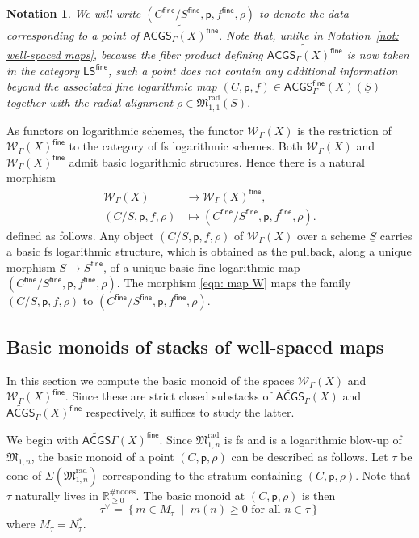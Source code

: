 \documentclass{article}
\def\R{\mathbb{R}}
\def\WG{\mathcal{W}_{\Gamma}}
\newtheorem{notation}[definition]{Notation}
\newcommand{\rad}{\mathrm{rad}}
\newcommand{\fine}{\mathsf{fine}}
\begin{document}
\begin{notation}
   We will write $(C^{\fine}/S^{\fine},\mathsf{p},f^{\fine},\rho)$ to denote the data corresponding to a point of
$
\widetilde{\mathsf{ACGS}_{\Gamma}(X)^{\mathsf{fine}}}.
$
Note that, unlike in Notation~\ref{not: well-spaced maps}, because the fiber product defining 
$
\widetilde{\mathsf{ACGS}_{\Gamma}(X)^{\mathsf{fine}}}
$
is now taken in the category $\mathsf{LS}^{\fine}$, such a point does not contain any additional information beyond the associated fine logarithmic map
$
(C,\mathsf{p},f)\in \mathsf{ACGS}^{\fine}_{\Gamma}(X)(\underline{S})
$
together with the radial alignment
$
\rho\in \mathfrak{M}_{1,1}^{\mathrm{rad}}(\underline{S}).
$
\end{notation}


As functors on logarithmic schemes, the functor $\WG(X)$ is the restriction of $\WG(X)^{\fine}$ to the category of fs logarithmic schemes. Both $\WG(X)$ and $\WG(X)^{\fine}$ admit basic logarithmic structures. Hence there is a natural morphism
\begin{equation}\label{eqn: map W}
\begin{aligned}
\WG(X) &\longrightarrow \WG(X)^{\fine}, \\
(C/S,\mathsf{p},f,\rho) &\longmapsto (C^{\fine}/S^{\fine},\mathsf{p},f^{\fine},\rho).
\end{aligned}
\end{equation}
defined as follows. Any object $(C/S,\mathsf{p},f,\rho)$ of $\WG(X)$ over a scheme $\underline{S}$ carries a basic fs logarithmic structure, which is obtained as the pullback, along a unique morphism $S \to S^{\fine}$, of a unique basic fine logarithmic map $(C^{\fine}/S^{\fine},\mathsf{p},f^{\fine},\rho)$. The morphism \eqref{eqn: map W} maps the family $(C/S,\mathsf{p},f,\rho)$ to $(C^{\fine}/S^{\fine},\mathsf{p},f^{\fine},\rho)$. 

\subsection{Basic monoids of stacks of well-spaced maps}

In this section we compute the basic monoid of the spaces $\WG(X)$ and $\WG(X)^{\mathsf{fine}}$. Since these are strict closed substacks of $\widetilde{\mathsf{ACGS}}_{\Gamma}(X)$ and $\widetilde{\mathsf{ACGS}}_{\Gamma}(X)^\fine$ respectively, it suffices to study the latter.

We begin with $\widetilde{\mathsf{ACGS}}{\Gamma}(X)^\fine$. Since $\mathfrak{M}_{1,n}^{\rad}$ is fs and is a logarithmic blow-up of $\mathfrak{M}_{1,n}$, the basic monoid of a point $(C,\mathsf{p},\rho)$ can be described as follows. Let $\tau$ be cone of $\Sigma(\mathfrak{M}_{1,n}^{\rad})$ corresponding to the stratum containing $(C,\mathsf{p}, \rho)$. Note that $\tau$ naturally lives in $\R_{\geq 0}^{\#\mathrm{nodes}}$. The basic monoid at $(C,\mathsf{p}, \rho)$  is then  
\[
\tau^\vee = \left\{ m \in M_{\tau} \;\middle|\; m(n) \ge 0 \text{ for all } n \in \tau \right\}
\]
where $M_\tau=N_\tau^*$.
\end{document}
